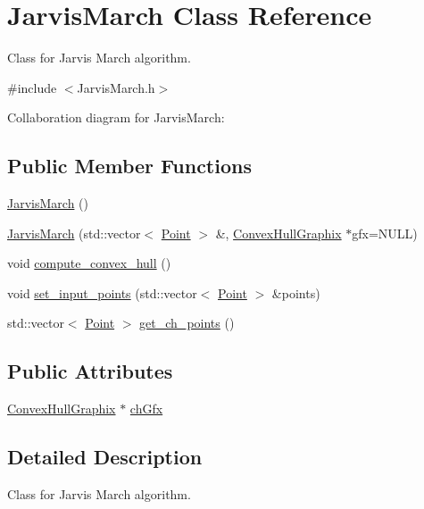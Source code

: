 \hypertarget{class_jarvis_march}{}\section{Jarvis\+March Class Reference}
\label{class_jarvis_march}


Class for Jarvis March algorithm.  




{\ttfamily \#include $<$Jarvis\+March.\+h$>$}



Collaboration diagram for Jarvis\+March\+:
\subsection*{Public Member Functions}
\begin{DoxyCompactItemize}
\item 
\mbox{\hyperlink{class_jarvis_march_a077887259741d7c57e1f64ea9ce7b324}{Jarvis\+March}} ()
\item 
\mbox{\hyperlink{class_jarvis_march_a0f28b67cdc8868e9ccb84bbcc3ef340f}{Jarvis\+March}} (std\+::vector$<$ \mbox{\hyperlink{class_point}{Point}} $>$ \&, \mbox{\hyperlink{class_convex_hull_graphix}{Convex\+Hull\+Graphix}} $\ast$gfx=N\+U\+LL)
\item 
void \mbox{\hyperlink{class_jarvis_march_a5617c3acf6ab1f5ad7988e0c856740c3}{compute\+\_\+convex\+\_\+hull}} ()
\item 
void \mbox{\hyperlink{class_jarvis_march_a53ff2d27872fa533efb2ce222a9dde88}{set\+\_\+input\+\_\+points}} (std\+::vector$<$ \mbox{\hyperlink{class_point}{Point}} $>$ \&points)
\item 
std\+::vector$<$ \mbox{\hyperlink{class_point}{Point}} $>$ \mbox{\hyperlink{class_jarvis_march_ae07fa1d85d5be1e876baa79a0a15e6bf}{get\+\_\+ch\+\_\+points}} ()
\end{DoxyCompactItemize}
\subsection*{Public Attributes}
\begin{DoxyCompactItemize}
\item 
\mbox{\hyperlink{class_convex_hull_graphix}{Convex\+Hull\+Graphix}} $\ast$ \mbox{\hyperlink{class_jarvis_march_a6fb3af00dde6115578e1accc2e8b953c}{ch\+Gfx}}
\end{DoxyCompactItemize}


\subsection{Detailed Description}
Class for Jarvis March algorithm. 


